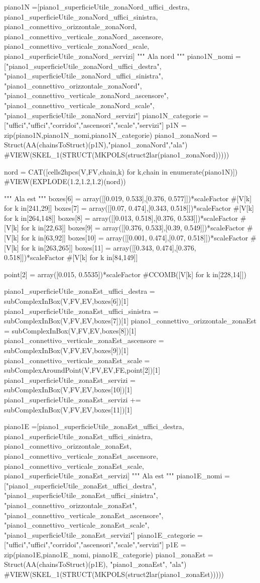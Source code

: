 piano1N =[piano1_superficieUtile_zonaNord_uffici_destra, piano1_superficieUtile_zonaNord_uffici_sinistra, piano1_connettivo_orizzontale_zonaNord, piano1_connettivo_verticale_zonaNord_ascensore, piano1_connettivo_verticale_zonaNord_scale, piano1_superficieUtile_zonaNord_servizi]
""" Ala nord """
piano1N_nomi =["piano1_superficieUtile_zonaNord_uffici_destra", "piano1_superficieUtile_zonaNord_uffici_sinistra", "piano1_connettivo_orizzontale_zonaNord", "piano1_connettivo_verticale_zonaNord_ascensore", "piano1_connettivo_verticale_zonaNord_scale", "piano1_superficieUtile_zonaNord_servizi"]
piano1N_categorie =["uffici","uffici","corridoi","ascensori","scale","servizi"]
p1N = zip(piano1N,piano1N_nomi,piano1N_categorie)
piano1_zonaNord = Struct(AA(chainsToStruct)(p1N),"piano1_zonaNord","ala")
#VIEW(SKEL_1(STRUCT(MKPOLS(struct2lar(piano1_zonaNord)))))
    
nord = CAT([cells2hpcs(V,FV,chain,k) for k,chain in enumerate(piano1N)])
#VIEW(EXPLODE(1.2,1.2,1.2)(nord))

""" Ala est """
boxes[6] = array([[0.019, 0.533],[0.376, 0.577]])*scaleFactor #[V[k] for k in[241,29]]
boxes[7] = array([[0.07, 0.474],[0.343, 0.518]])*scaleFactor #[V[k] for k in[264,148]]
boxes[8] = array([[0.013, 0.518],[0.376, 0.533]])*scaleFactor #[V[k] for k in[22,63]]
boxes[9] = array([[0.376, 0.533],[0.39, 0.549]])*scaleFactor #[V[k] for k in[63,92]]
boxes[10] = array([[0.001, 0.474],[0.07, 0.518]])*scaleFactor #[V[k] for k in[263,265]]
boxes[11] = array([[0.343, 0.474],[0.376, 0.518]])*scaleFactor #[V[k] for k in[84,149]]

point[2] = array([0.015, 0.5535])*scaleFactor #CCOMB([V[k] for k in[228,14]])

piano1_superficieUtile_zonaEst_uffici_destra = subComplexInBox(V,FV,EV,boxes[6])[1]
piano1_superficieUtile_zonaEst_uffici_sinistra = subComplexInBox(V,FV,EV,boxes[7])[1]
piano1_connettivo_orizzontale_zonaEst = subComplexInBox(V,FV,EV,boxes[8])[1]
piano1_connettivo_verticale_zonaEst_ascensore = subComplexInBox(V,FV,EV,boxes[9])[1]
piano1_connettivo_verticale_zonaEst_scale = subComplexAroundPoint(V,FV,EV,FE,point[2])[1]
piano1_superficieUtile_zonaEst_servizi = subComplexInBox(V,FV,EV,boxes[10])[1]
piano1_superficieUtile_zonaEst_servizi += subComplexInBox(V,FV,EV,boxes[11])[1]

piano1E =[piano1_superficieUtile_zonaEst_uffici_destra, piano1_superficieUtile_zonaEst_uffici_sinistra, piano1_connettivo_orizzontale_zonaEst, piano1_connettivo_verticale_zonaEst_ascensore, piano1_connettivo_verticale_zonaEst_scale, piano1_superficieUtile_zonaEst_servizi]
""" Ala est """
piano1E_nomi =["piano1_superficieUtile_zonaEst_uffici_destra", "piano1_superficieUtile_zonaEst_uffici_sinistra", "piano1_connettivo_orizzontale_zonaEst", "piano1_connettivo_verticale_zonaEst_ascensore", "piano1_connettivo_verticale_zonaEst_scale", "piano1_superficieUtile_zonaEst_servizi"]
piano1E_categorie =["uffici","uffici","corridoi","ascensori","scale","servizi"]
p1E = zip(piano1E,piano1E_nomi, piano1E_categorie)
piano1_zonaEst = Struct(AA(chainsToStruct)(p1E), "piano1_zonaEst", "ala")
#VIEW(SKEL_1(STRUCT(MKPOLS(struct2lar(piano1_zonaEst)))))

